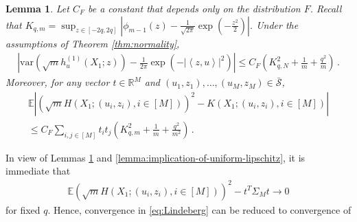 \documentclass[12pt]{article}
\renewcommand{\exp}[1]{\operatorname{exp}\left(#1\right)} %
\newcommand\var{\mathrm{var}}
\def\l{\left}
\def\r{\right}
\newcommand{\mb}{\mathbb}
\newcommand{\dotp}[2]{\left\langle#1,#2\right\rangle}
\newtheorem{lemma}{Lemma}
\theoremstyle{thmstyletwo}%
\theoremstyle{thmstylethree}%
\begin{document}
\begin{lemma}
\label{lemma: sqrt_l_h_convergence}
    Let $C_F$ be a constant that depends only on the distribution $F$. Recall that $K_{q,m} = \sup_{z \in [-2q,2q]}\l\lvert \phi_{m-1}(z) - \frac{1}{\sqrt{2\pi}}\exp{-\frac{z^2}{2}}\r\rvert$. Under the assumptions of Theorem \ref{thm:normality}, 
    \begin{align}
    \label{eq:variance-hajek-THL}
        \l\lvert \var\l(\sqrt{m} h^{(1)}_{u}\l(X_1;z\r)\r) - \frac{1}{2\pi}\exp{-\l\lvert \dotp{z}{u} \r\rvert^2} \r\rvert \leq C_F\l(K^2_{q,N} +\frac{1}{m} + \frac{q^2}{m}\r)\,.
    \end{align}
    Moreover, for any vector $t \in \mb R^M$ and $(u_1, z_1), \ldots, (u_M, z_M) \in \bar{\mathcal{S}}$,
    \begin{multline}\label{eq:key-L1-convergence}
    \mb E \l\lvert  \l(\sqrt{m} H(X_1; (u_i, z_i), i \in [M])\r)^2 - K(X_1; (u_i, z_i), i \in [M]) \r\rvert \\
    \leq C_F\sum_{i, j \in [M]} t_i t_j \l(K_{q,m}^2 + \frac{1}{m} + \frac{q^2}{m^2}\r)\,.
\end{multline}

\end{lemma}
\noindent In view of Lemmas \ref{lemma: sqrt_l_h_convergence} and \ref{lemma:implication-of-uniform-lipschitz}, it is immediate that
\begin{align*}
    \mb E \l( \sqrt{m} H(X_1; (u_i, z_i), i \in [M]) \r)^2- t^T \Sigma_M t  \rightarrow 0
\end{align*}
for fixed $q$. Hence, convergence in \eqref{eq:Lindeberg} can be reduced to convergence of
\end{document}

